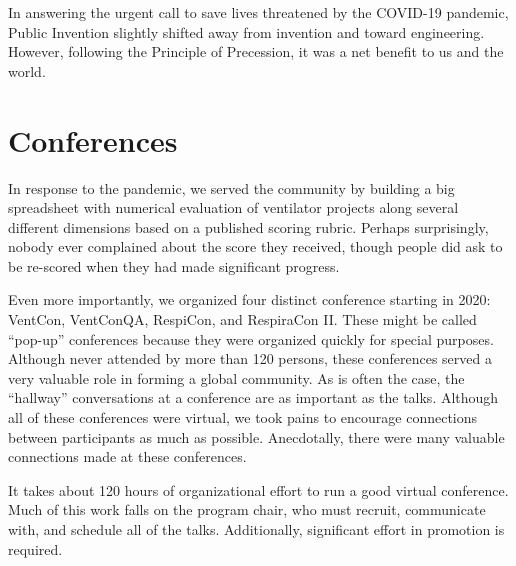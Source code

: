 \documentclass[
	fontsize=10pt, %
	twoside=false, %
	secnumdepth=1, %
]{kaobook}
\begin{document}
In answering the urgent call to save lives threatened by the COVID-19 pandemic,
Public Invention slightly shifted away from invention and toward engineering.
However, following the Principle of Precession, it was a net benefit
to us and the world.

\section{Conferences}

In response to the pandemic, we served the community by building a big spreadsheet
with numerical evaluation of ventilator projects along several different dimensions
based on a published scoring rubric.
Perhaps surprisingly, nobody ever complained about the score they received,
though people did ask to be re-scored when they had made significant progress.

Even more importantly, we organized four distinct conference starting in 2020:
VentCon, VentConQA, RespiCon, and RespiraCon II. These might be called ``pop-up''
conferences because they were organized quickly for special purposes. Although
never attended by more than 120 persons, these conferences served a very valuable
role in forming a global community. As is often the case, the ``hallway'' conversations
at a conference are as important as the talks. Although all of these conferences were
virtual, we took pains to encourage connections between participants as much as possible.
Anecdotally, there were many valuable connections made at these conferences.

It takes about 120 hours of organizational effort to run a good virtual conference.
Much of this work falls on the program chair, who must recruit, communicate with, and
schedule all of the talks.
Additionally, significant effort in promotion is required.
\end{document}
